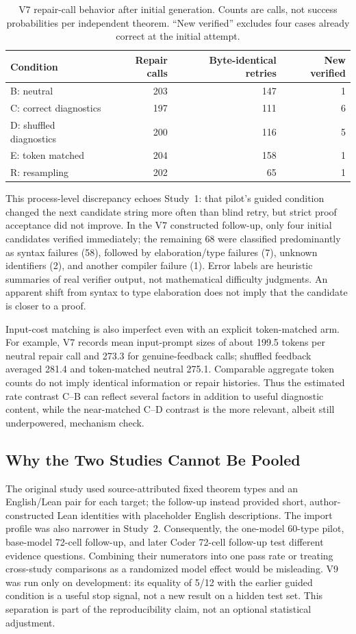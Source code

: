 \documentclass[runningheads,a4paper]{llncs}
\begin{document}
\begin{table}[t]\centering\small
\caption{V7 repair-call behavior after initial generation. Counts are calls,
not success probabilities per independent theorem. ``New verified'' excludes
four cases already correct at the initial attempt.}
\label{tab:process}
\begin{tabular}{lrrr}\toprule
Condition & Repair calls & Byte-identical retries & New verified \\
\midrule
B: neutral &203&147&1\\
C: correct diagnostics &197&111&6\\
D: shuffled diagnostics &200&116&5\\
E: token matched &204&158&1\\
R: resampling &202&65&1\\
\bottomrule\end{tabular}
\end{table}

This process-level discrepancy echoes Study~1: that pilot's guided
condition changed the next candidate string more often than blind retry,
but strict proof acceptance did not improve. In the V7 constructed
follow-up, only four initial candidates verified immediately; the remaining
68 were classified predominantly as syntax failures (58), followed by
elaboration/type failures (7), unknown identifiers (2), and another compiler
failure (1). Error labels are heuristic summaries of real verifier output,
not mathematical difficulty judgments. An apparent shift from syntax to
type elaboration does not imply that the candidate is closer to a proof.

Input-cost matching is also imperfect even with an explicit token-matched
arm. For example, V7 records mean input-prompt sizes of about 199.5 tokens
per neutral repair call and 273.3 for genuine-feedback calls; shuffled
feedback averaged 281.4 and token-matched neutral 275.1. Comparable
aggregate token counts do not imply identical information or repair histories.
Thus the estimated rate contrast C--B can reflect several factors in
addition to useful diagnostic content, while the near-matched C--D contrast
is the more relevant, albeit still underpowered, mechanism check.

\subsection{Why the Two Studies Cannot Be Pooled}
The original study used source-attributed fixed theorem types and an
English/Lean pair for each target; the follow-up instead provided short,
author-constructed Lean identities with placeholder English descriptions.
The import profile was also narrower in Study~2. Consequently, the
one-model 60-type pilot, base-model 72-cell follow-up, and later Coder
72-cell follow-up test different evidence questions. Combining their
numerators into one pass rate or treating cross-study comparisons as a
randomized model effect would be misleading. V9 was run only on development:
its equality of 5/12 with the earlier guided condition is a useful stop
signal, not a new result on a hidden test set. This separation is part of
the reproducibility claim, not an optional statistical adjustment.
\end{document}

